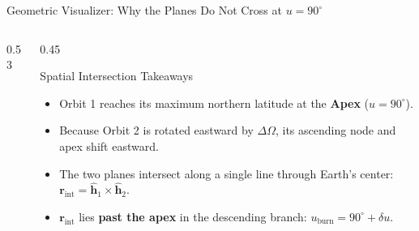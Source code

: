 \documentclass[aspectratio=169,10pt]{beamer}
\begin{document}
\begin{frame}{Geometric Visualizer: Why the Planes Do Not Cross at \texorpdfstring{$u = 90^\circ$}{u = 90 deg}}
\begin{columns}[c]
\begin{column}{0.53\textwidth}
        \end{column}
        
        \begin{column}{0.45\textwidth}
            \begin{block}{Spatial Intersection Takeaways}
                \footnotesize
                \begin{itemize}\setlength{\itemsep}{5pt}
                    \item Orbit 1 reaches its maximum northern latitude at the \textbf{Apex} ($u = 90^\circ$).
                    \item Because Orbit 2 is rotated eastward by $\Delta\Omega$, its ascending node and apex shift eastward.
                    \item The two planes intersect along a single line through Earth's center: $\mathbf{r}_{\text{int}} = \hat{\mathbf{h}}_1 \times \hat{\mathbf{h}}_2$.
                    \item $\mathbf{r}_{\text{int}}$ lies \textbf{past the apex} in the descending branch: $u_{\text{burn}} = 90^\circ + \delta u$.
                \end{itemize}
            \end{block}
        \end{column}
    \end{columns}
\end{frame}
\end{document}
